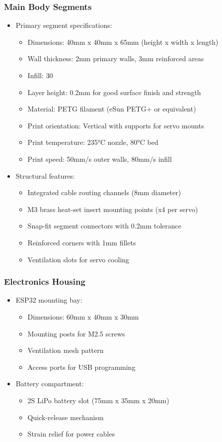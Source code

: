 \documentclass[12pt,a4paper]{report}
\begin{document}
\subsubsection{Main Body Segments}
\begin{itemize}
\item Primary segment specifications:
\begin{itemize}
\item Dimensions: 40mm x 40mm x 65mm (height x width x length)
\item Wall thickness: 2mm primary walls, 3mm reinforced areas
\item Infill: 30%
\item Layer height: 0.2mm for good surface finish and strength
\item Material: PETG filament (eSun PETG+ or equivalent)
\item Print orientation: Vertical with supports for servo mounts
\item Print temperature: 235°C nozzle, 80°C bed
\item Print speed: 50mm/s outer walls, 80mm/s infill
\end{itemize}
\item Structural features:
\begin{itemize}
    \item Integrated cable routing channels (8mm diameter)
    \item M3 brass heat-set insert mounting points (x4 per servo)
    \item Snap-fit segment connectors with 0.2mm tolerance
    \item Reinforced corners with 1mm fillets
    \item Ventilation slots for servo cooling
\end{itemize}
\end{itemize}
\subsubsection{Electronics Housing}
\begin{itemize}
\item ESP32 mounting bay:
\begin{itemize}
\item Dimensions: 60mm x 40mm x 30mm
\item Mounting posts for M2.5 screws
\item Ventilation mesh pattern
\item Access ports for USB programming
\end{itemize}
\item Battery compartment:
\begin{itemize}
    \item 2S LiPo battery slot (75mm x 35mm x 20mm)
    \item Quick-release mechanism
    \item Strain relief for power cables
\end{itemize}
\end{itemize}
\end{document}
